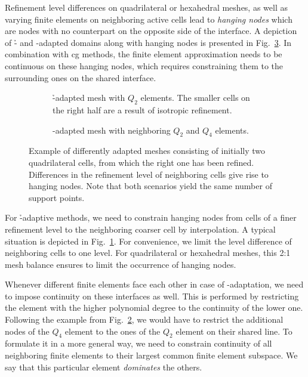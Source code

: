 Refinement level differences on quadrilateral or hexahedral meshes, as well as varying finite elements on neighboring active cells lead to \textit{hanging nodes} which are nodes with no counterpart on the opposite side of the interface. A depiction of \h- and \p-adapted domains along with hanging nodes is presented in Fig.~\ref{fig:hpadaptivity}.
In combination with \gls{cg} methods, the finite element approximation needs to be continuous on these hanging nodes, which requires constraining them to the surrounding ones on the shared interface.

\begin{figure}
\begin{subfigure}[t]{0.48\textwidth}
  \centering
  
  \caption{\h-adapted mesh with $Q_2$ elements. The smaller cells on the right half are a result of isotropic refinement.}
  \label{fig:hapaptivity}
\end{subfigure}
\hfill{}
\begin{subfigure}[t]{0.48\textwidth}
  \centering
  
  \caption{\p-adapted mesh with neighboring $Q_2$ and $Q_4$ elements.}
  \label{fig:papaptivity}
\end{subfigure}
\caption[Differences between \h- and \p-adaptation.]{Example of differently adapted meshes consisting of initially two quadrilateral cells, from which the right one has been refined. Differences in the refinement level of neighboring cells give rise to hanging nodes. Note that both scenarios yield the same number of support points.}
\label{fig:hpadaptivity}
\end{figure}

For \h-adaptive methods, we need to constrain hanging nodes from cells of a finer refinement level to the neighboring coarser cell by interpolation. A typical situation is depicted in Fig.~\ref{fig:hapaptivity}. For convenience, we limit the level difference of neighboring cells to one level.
For quadrilateral or hexahedral meshes, this 2:1 mesh balance ensures to limit the occurrence of hanging nodes.

Whenever different finite elements face each other in case of \p-adaptation, we need to impose continuity on these interfaces as well. This is performed by restricting the element with the higher polynomial degree to the continuity of the lower one. Following the example from Fig.~\ref{fig:papaptivity}, we would have to restrict the additional nodes of the $Q_4$ element to the ones of the $Q_2$ element on their shared line. To formulate it in a more general way, we need to constrain continuity of all neighboring finite elements to their largest common finite element subspace. We say that this particular element \textit{dominates} the others.

